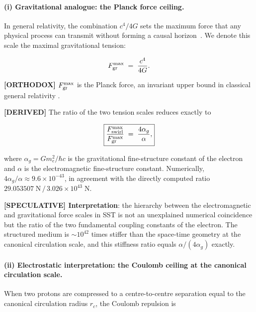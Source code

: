 \documentclass[11pt]{article}
\theoremstyle{definition}
\theoremstyle{plain}
\theoremstyle{remark}
\newcommand{\rc}{{r_c}}
\begin{document}
        \paragraph{(i) Gravitational analogue: the Planck force ceiling.}

        In general relativity, the combination $c^4/4G$ sets the maximum force that any physical process can transmit without forming a causal horizon~\cite{Gibbons2002}. We denote this scale the maximal gravitational tension:

        \begin{align}
            F_{\rm gr}^{\max} \;=\; \frac{c^4}{4G}.
            \label{eq:Fgr}
        \end{align}

        \textbf{[ORTHODOX]} $F_{\rm gr}^{\max}$ is the Planck force, an invariant upper bound in classical general relativity \cite{Gibbons2002}.

        \textbf{[DERIVED]} The ratio of the two tension scales reduces exactly to

        \begin{align}
            \boxed{
            \frac{F_{\rm swirl}^{\max}}{F_{\rm gr}^{\max}}
            \;=\; \frac{4\alpha_g}{\alpha},
            }
            \label{eq:Fmax_ratio}
        \end{align}

        where $\alpha_g = Gm_e^2/\hbar c$ is the gravitational fine-structure constant of the electron and $\alpha$ is the electromagnetic fine-structure constant. Numerically, $4\alpha_g/\alpha \approx 9.6\times10^{-43}$, in agreement with the directly computed ratio $29.053507\;\text{N}\,/\,3.026\times10^{43}\;\text{N}$.

        \textbf{[SPECULATIVE] Interpretation}: the hierarchy between the electromagnetic and gravitational force scales in SST is not an unexplained numerical coincidence but the ratio of the two fundamental coupling constants of the electron. The structured medium is $\sim\!10^{42}$ times stiffer than the space-time geometry at the canonical circulation scale, and this stiffness ratio equals $\alpha/(4\alpha_g)$ exactly.

        \paragraph{(ii) Electrostatic interpretation: the Coulomb ceiling at the canonical circulation scale.}

        When two protons are compressed to a centre-to-centre separation equal to the canonical circulation radius $\rc$, the Coulomb repulsion is
\end{document}
